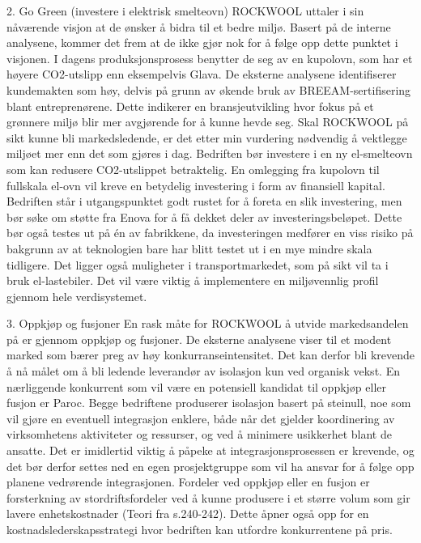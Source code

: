 2. Go Green (investere i elektrisk smelteovn)
ROCKWOOL uttaler i sin nåværende visjon at de ønsker å bidra til et bedre miljø. Basert på de interne analysene, kommer det frem at de ikke gjør nok for å følge opp dette punktet i visjonen. I dagens produksjonsprosess benytter de seg av en kupolovn, som har et høyere CO2-utslipp enn eksempelvis Glava. De eksterne analysene identifiserer kundemakten som høy, delvis på grunn av økende bruk av BREEAM-sertifisering blant entreprenørene. Dette indikerer en bransjeutvikling hvor fokus på et grønnere miljø blir mer avgjørende for å kunne hevde seg. Skal ROCKWOOL på sikt kunne bli markedsledende, er det etter min vurdering nødvendig å vektlegge miljøet mer enn det som gjøres i dag. Bedriften bør investere i en ny el-smelteovn som kan redusere CO2-utslippet betraktelig. En omlegging fra kupolovn til fullskala el-ovn vil kreve en betydelig investering i form av finansiell kapital. Bedriften står i utgangspunktet godt rustet for å foreta en slik investering, men bør søke om støtte fra Enova for å få dekket deler av investeringsbeløpet. Dette bør også testes ut på én av fabrikkene, da investeringen medfører en viss risiko på bakgrunn av at teknologien bare har blitt testet ut i en mye mindre skala tidligere.  Det ligger også muligheter i transportmarkedet, som på sikt vil ta i bruk el-lastebiler. Det vil være viktig å implementere en miljøvennlig profil gjennom hele verdisystemet.  

3. Oppkjøp og fusjoner 
En rask måte for ROCKWOOL å utvide markedsandelen på er gjennom oppkjøp og fusjoner. De eksterne analysene viser til et modent marked som bærer preg av høy konkurranseintensitet. Det kan derfor bli krevende å nå målet om å bli ledende leverandør av isolasjon kun ved organisk vekst. En nærliggende konkurrent som vil være en potensiell kandidat til oppkjøp eller fusjon er Paroc. Begge bedriftene produserer isolasjon basert på steinull, noe som vil gjøre en eventuell integrasjon enklere, både når det gjelder koordinering av virksomhetens aktiviteter og ressurser, og ved å minimere usikkerhet blant de ansatte. Det er imidlertid viktig å påpeke at integrasjonsprosessen er krevende, og det bør derfor settes ned en egen prosjektgruppe som vil ha ansvar for å følge opp planene vedrørende integrasjonen. Fordeler ved oppkjøp eller en fusjon er forsterkning av stordriftsfordeler ved å kunne produsere i et større volum som gir lavere enhetskostnader (Teori fra s.240-242). Dette åpner også opp for en kostnadslederskapsstrategi hvor bedriften kan utfordre konkurrentene på pris.

